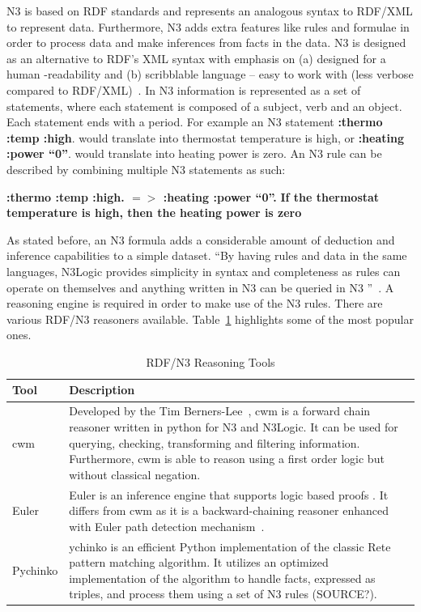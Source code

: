 \documentclass[conference]{IEEEtran}
\begin{document}
N3 is based on RDF standards and represents an analogous syntax to RDF/XML to represent data.  Furthermore, N3 adds extra features like rules and formulae in
order to process data and make inferences from facts in the data.  N3 is designed as an alternative to RDF's XML syntax with emphasis on (a) designed for a
human -readability and (b) scribblable language – easy to work with (less verbose compared to RDF/XML)~\cite{notation3}.  In N3 information is represented as a
set of statements, where each statement is composed of a subject, verb and an object. Each statement ends with a period.
For example an N3 statement \textbf{{:thermo :temp :high}}. would translate into thermostat temperature is high, or \textbf{{:heating :power “0”}}. would
translate into heating power is zero.  An N3 rule can be described by combining multiple N3 statements as such:

\textbf{{:thermo :temp :high}. $=>$ {:heating :power “0”}.}\newline
\textbf{If the thermostat temperature is high, then the heating power is zero}

As stated before, an N3 formula adds a considerable amount of deduction and inference capabilities to a simple dataset.  “By having rules and data in the same
languages, N3Logic provides simplicity in syntax and completeness as rules can operate on themselves and anything written in N3 can be queried in N3
”~\cite{berners-lee2008}. A reasoning engine is required in order to make use of the N3 rules.  There are various RDF/N3 reasoners available.
Table~\ref{tab:n3tools} highlights some of the most popular ones.

\begin{table}
\centering
 \begin{tabular}{m{1cm}|m{9cm}}
\textbf{Tool} & \textbf{Description}\\
\hline\hline
cwm & Developed by the Tim Berners-Lee~\cite{berners-lee2008}, cwm is a forward chain reasoner written in python for N3 and N3Logic.  It can be used for
querying, checking, transforming and filtering information.  Furthermore, cwm is able to reason using a first order logic but without classical negation.\\
\hline
Euler & Euler is an inference engine that supports logic based proofs .  It differs from cwm as it is a backward-chaining reasoner enhanced with Euler path
detection mechanism~\cite{naudts2003inference}.\\
\hline
Pychinko & ychinko is an efficient Python implementation of the classic Rete pattern matching algorithm.  It utilizes an optimized implementation of the
algorithm to handle facts, expressed as triples, and process them using a set of N3 rules (SOURCE?).\\
 \end{tabular}
\label{tab:n3tools}
\caption{RDF/N3 Reasoning Tools}
\end{table}
\end{document}
